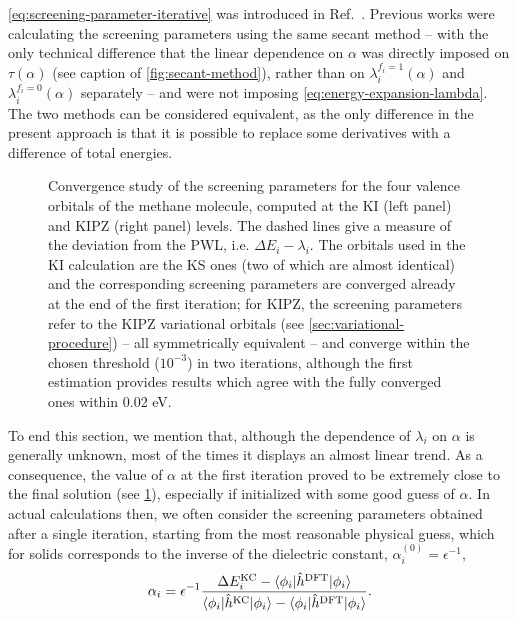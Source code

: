 \cref{eq:screening-parameter-iterative} was introduced in Ref.~\cite{nguyen_koopmans-compliant_2018}. Previous works were calculating the screening parameters using the same secant method -- with the only technical difference that the linear dependence on $\alpha$ was directly imposed on $\tau(\alpha)$ (see caption of \cref{fig:secant-method}), rather than on $\lambda_i^{f_i=1}(\alpha)$ and $\lambda_i^{f_i=0}(\alpha)$ separately -- and were not imposing \cref{eq:energy-expansion-lambda}. The two methods can be considered equivalent, as the only difference in the present approach is that it is possible to replace some derivatives with a difference of total energies.

\begin{figure}
    \centering
     \qquad
    \caption[Convergence of screening parameters]{Convergence study of the screening parameters for the four valence orbitals of the methane molecule, computed at the KI (left panel) and KIPZ (right panel) levels. The dashed lines give a measure of the deviation from the PWL, i.e. $\Delta E_i - \lambda_i$. The orbitals used in the KI calculation are the KS ones (two of which are almost identical) and the corresponding screening parameters are converged already at the end of the first iteration; for KIPZ, the screening parameters refer to the KIPZ variational orbitals (see \cref{sec:variational-procedure}) -- all symmetrically equivalent -- and converge within the chosen threshold ($10^{-3}$) in two iterations, although the first estimation provides results which agree with the fully converged ones within 0.02 eV.}
    \label{fig:alphas-convergence}
\end{figure}

To end this section, we mention that, although the dependence of $\lambda_i$ on $\alpha$ is generally unknown, most of the times it displays an almost linear trend. As a consequence, the value of $\alpha$ at the first iteration proved to be extremely close to the final solution (see \cref{fig:alphas-convergence}), especially if initialized with some good guess of $\alpha$. In actual calculations then, we often consider the screening parameters obtained after a single iteration, starting from the most reasonable physical guess, which for solids corresponds to the inverse of the dielectric constant, $\alpha_i^{(0)} = \epsilon^{-1}$,
%
\begin{equation}
    \alpha_i = \epsilon^{-1} \frac{\Delta E^{\rm KC}_i - \braket{\phi_i|\hat{h}^{\rm DFT}|\phi_i}}{\braket{\phi_i|\hat{h}^{\rm KC}|\phi_i} - \braket{\phi_i|\hat{h}^{\rm DFT}|\phi_i}} .
    \label{eq:screening-parameter-dscf}
\end{equation}

